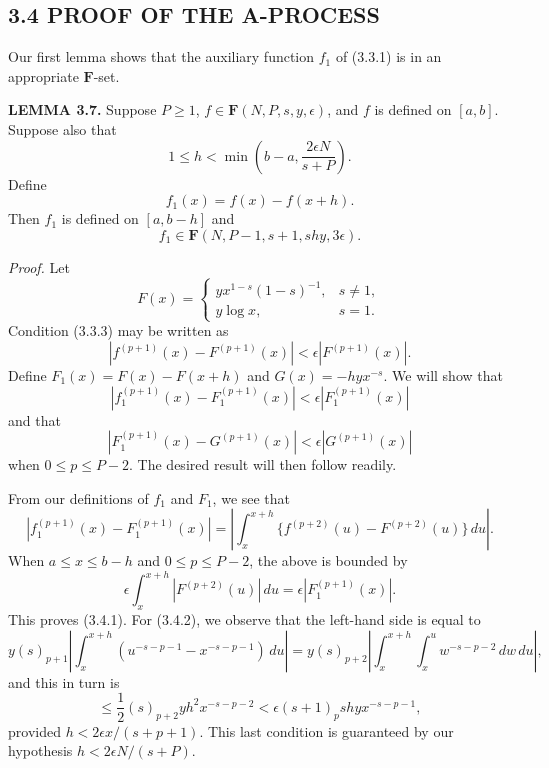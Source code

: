 \documentclass[10pt]{article}
\newcommand{\Fclass}{\mathbf{F}}
\begin{document}
\subsection*{3.4 PROOF OF THE A-PROCESS}

Our first lemma shows that the auxiliary function $f_1$ of (3.3.1) is in an
appropriate $\Fclass$-set.

\medskip
\noindent\textbf{LEMMA 3.7.}
Suppose $P\geq1$, $f\in\Fclass(N,P,s,y,\epsilon)$, and $f$ is defined on
$[a,b]$. Suppose also that
\[
 1\leq h<\min\left(b-a,\frac{2\epsilon N}{s+P}\right).
\]
Define
\[
 f_1(x)=f(x)-f(x+h).
\]
Then $f_1$ is defined on $[a,b-h]$ and
\[
 f_1\in\Fclass(N,P-1,s+1,shy,3\epsilon).
\]

\noindent\textit{Proof.}
Let
\[
 F(x)=
 \begin{cases}
  yx^{1-s}(1-s)^{-1},&s\neq1,\\
  y\log x,&s=1.
 \end{cases}
\]
Condition (3.3.3) may be written as
\[
 |f^{(p+1)}(x)-F^{(p+1)}(x)|
 <\epsilon|F^{(p+1)}(x)|.
\]
Define $F_1(x)=F(x)-F(x+h)$ and $G(x)=-hyx^{-s}$. We will show that
\begin{equation*}
 |f_1^{(p+1)}(x)-F_1^{(p+1)}(x)|
 <\epsilon|F_1^{(p+1)}(x)| \tag{3.4.1}
\end{equation*}
and that
\begin{equation*}
 |F_1^{(p+1)}(x)-G^{(p+1)}(x)|
 <\epsilon|G^{(p+1)}(x)| \tag{3.4.2}
\end{equation*}
when $0\leq p\leq P-2$. The desired result will then follow readily.

From our definitions of $f_1$ and $F_1$, we see that
\[
 |f_1^{(p+1)}(x)-F_1^{(p+1)}(x)|
 =\left|\int_x^{x+h}
   \{f^{(p+2)}(u)-F^{(p+2)}(u)\}\,du\right|.
\]
When $a\leq x\leq b-h$ and $0\leq p\leq P-2$, the above is bounded by
\[
 \epsilon\int_x^{x+h}|F^{(p+2)}(u)|\,du
 =\epsilon|F_1^{(p+1)}(x)|.
\]
This proves (3.4.1). For (3.4.2), we observe that the left-hand side is equal
to
\[
 y(s)_{p+1}\left|\int_x^{x+h}
  (u^{-s-p-1}-x^{-s-p-1})\,du\right|
 =y(s)_{p+2}\left|\int_x^{x+h}\int_x^u
  w^{-s-p-2}\,dw\,du\right|,
\]
and this in turn is
\[
 \leq\frac12(s)_{p+2}yh^2x^{-s-p-2}
 <\epsilon(s+1)_p shy x^{-s-p-1},
\]
provided $h<2\epsilon x/(s+p+1)$. This last condition is guaranteed by our
hypothesis $h<2\epsilon N/(s+P)$.
\end{document}
